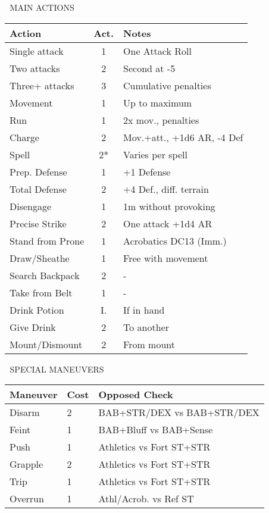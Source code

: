 \documentclass[10pt,a4paper,landscape]{article}
\begin{document}
\begin{multicols}{4}
		\begin{mainsection}{📜 MAIN ACTIONS}
			{\small
				\begin{tabular}{@{}p{2cm}cp{3cm}@{}}
					\toprule
					\textbf{Action} & \textbf{Act.} & \textbf{Notes} \\
					\midrule
					Single attack & 1 & One Attack Roll \\
					Two attacks & 2 & Second at -5 \\
					Three+ attacks & 3 & Cumulative penalties \\
					\midrule
					Movement & 1 & Up to maximum \\
					Run & 1 & 2x mov., penalties \\
					Charge & 2 & Mov.+att., +1d6 AR, -4 Def \\
					\midrule
					Spell & 2* & Varies per spell \\
					Prep. Defense & 1 & +1 Defense \\
					Total Defense & 2 & +4 Def., diff. terrain \\
					Disengage & 1 & 1m without provoking \\
					Precise Strike & 2 & One attack +1d4 AR \\
					\midrule
					Stand from Prone & 1 & Acrobatics DC13 (Imm.) \\
					Draw/Sheathe & 1 & Free with movement \\
					Search Backpack & 2 & - \\
					Take from Belt & 1 & - \\
					\midrule
					Drink Potion & I. & If in hand \\
					Give Drink & 2 & To another \\
					Mount/Dismount & 2 & From mount \\
					\bottomrule
				\end{tabular}
			}
		\end{mainsection}

		\begin{mainsection}{🤺 SPECIAL MANEUVERS}
			\begin{tabular}{@{}p{1.7cm}p{0.8cm}p{3cm}@{}}
				\toprule
				\textbf{Maneuver} & \textbf{Cost} & \textbf{Opposed Check} \\
				\midrule
				Disarm & 2 & BAB+STR/DEX vs BAB+STR/DEX \\
				Feint & 1 & BAB+Bluff vs BAB+Sense \\
				Push & 1 & Athletics vs Fort ST+STR \\
				Grapple & 2 & Athletics vs Fort ST+STR \\
				Trip & 1 & Athletics vs Fort ST+STR \\
				Overrun & 1 & Athl/Acrob. vs Ref ST \\
				\bottomrule
			\end{tabular}


\end{mainsection}
\end{multicols}
\end{document}
